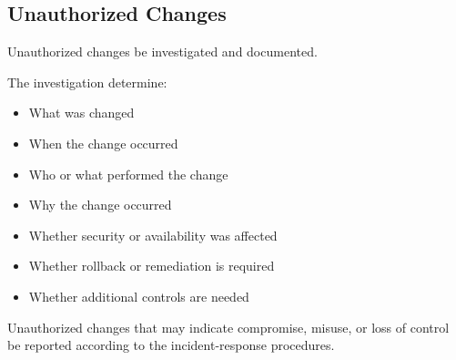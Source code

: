 \subsection{Unauthorized Changes}

Unauthorized changes \must{} be investigated and documented.

The investigation \should{} determine:
\begin{itemize}
    \item What was changed
    \item When the change occurred
    \item Who or what performed the change
    \item Why the change occurred
    \item Whether security or availability was affected
    \item Whether rollback or remediation is required
    \item Whether additional controls are needed
\end{itemize}

Unauthorized changes that may indicate compromise, misuse, or loss of control \must{} be reported according to the incident-response procedures.